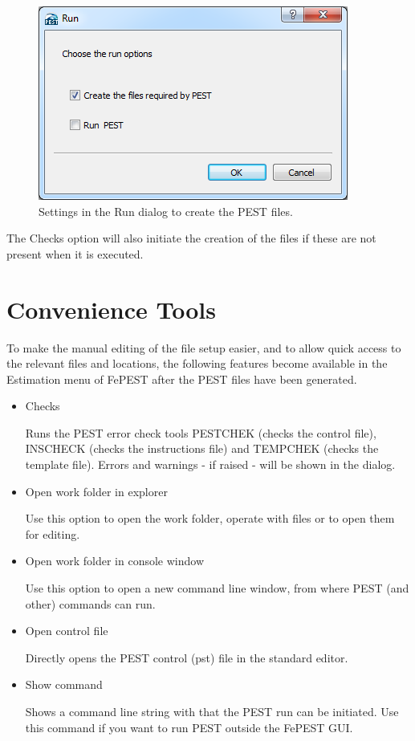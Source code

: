 \begin{figure}
	\center
	\includegraphics[width=\columnwidth]{figures/RunDialogCreateOnly.png}
\caption{Settings in the Run dialog to create the PEST files.}
\label{fig:fepest:RunDialogCreateOnly}
\end{figure}

The Checks option will also initiate the creation of the files if these are not present when it is executed.

\section{Convenience Tools}

To make the manual editing of the file setup easier, and to allow quick access to the relevant files and locations, the following features become available in the Estimation menu of FePEST after the PEST files have been generated.

\begin{itemize}
\item Checks

Runs the PEST error check tools PESTCHEK (checks the control file), INSCHECK (checks the instructions file) and TEMPCHEK (checks the template file). Errors and warnings - if raised - will be shown in the dialog. 

\item Open work folder in explorer

Use this option to open the work folder, operate with files or to open them for editing.

\item Open work folder in console window

Use this option to open a new command line window, from where PEST (and other) commands can run.

\item Open control file

Directly opens the PEST control (pst) file in the standard editor.

\item Show command

Shows a command line string with that the PEST run can be initiated. Use this command if you want to run PEST outside the FePEST GUI.
\end{itemize}


